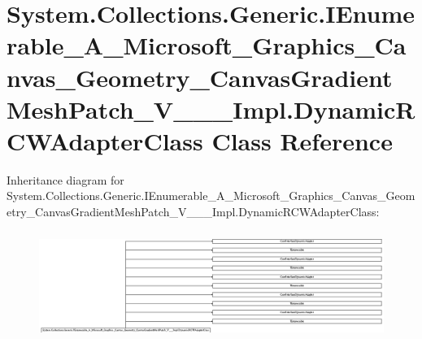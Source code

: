 \hypertarget{class_system_1_1_collections_1_1_generic_1_1_i_enumerable___a___microsoft___graphics___canvas___5dca239d171b705e4df5b136afa96b70}{}\section{System.\+Collections.\+Generic.\+I\+Enumerable\+\_\+\+A\+\_\+\+Microsoft\+\_\+\+Graphics\+\_\+\+Canvas\+\_\+\+Geometry\+\_\+\+Canvas\+Gradient\+Mesh\+Patch\+\_\+\+V\+\_\+\+\_\+\+\_\+\+Impl.\+Dynamic\+R\+C\+W\+Adapter\+Class Class Reference}
\label{class_system_1_1_collections_1_1_generic_1_1_i_enumerable___a___microsoft___graphics___canvas___5dca239d171b705e4df5b136afa96b70}
Inheritance diagram for System.\+Collections.\+Generic.\+I\+Enumerable\+\_\+\+A\+\_\+\+Microsoft\+\_\+\+Graphics\+\_\+\+Canvas\+\_\+\+Geometry\+\_\+\+Canvas\+Gradient\+Mesh\+Patch\+\_\+\+V\+\_\+\+\_\+\+\_\+\+Impl.\+Dynamic\+R\+C\+W\+Adapter\+Class\+:\begin{figure}[H]
\begin{center}
\leavevmode
\includegraphics[height=3.536165cm]{class_system_1_1_collections_1_1_generic_1_1_i_enumerable___a___microsoft___graphics___canvas___5dca239d171b705e4df5b136afa96b70}
\end{center}
\end{figure}
